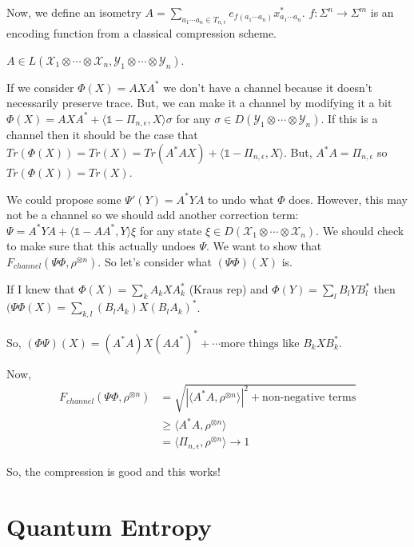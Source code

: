 \documentclass{article}
\begin{document}
\begin{theorem}
        Now, we define an isometry $ A = \sum\limits_{a_1 \cdots a_n \in
        T_{n,\epsilon} } e_{f(a_1\cdots a_n)} x_{a_1 \cdots a_n}^* $.
    $f: \Sigma^n \rightarrow \Sigma^m$ is an encoding function from a
    classical compression scheme.

    $ A \in L(\mathcal{X}_1 \otimes \cdots \otimes \mathcal{X}_n,
        \mathcal{Y}_1
    \otimes \cdots \otimes \mathcal{Y}_n) $.

    If we consider $ \Phi(X) = A X A^* $ we don't have a channel because
    it doesn't necessarily preserve trace. But, we can make it a channel
    by modifying it a bit $ \Phi(X) = A X A^* + \langle
    \mathds{1}-\Pi_{n,\epsilon},X\rangle\sigma $ for any $\sigma \in
    D(\mathcal{Y}_1\otimes\cdots\otimes \mathcal{Y}_n)$. If this is a
    channel then it should be the case that $Tr(\Phi(X)) = Tr(X) =
    Tr(A^*AX) + \langle \mathds{1}-\Pi_{n,\epsilon},X \rangle$. But,
    $A^*A = \Pi_{n,\epsilon}$ so $Tr(\Phi(X)) = Tr(X)$.

    We could propose some $ \Psi'(Y) = A^* Y A  $ to undo what $\Phi$
    does. However, this may not be a channel so we should add another
    correction term: $\Psi = A^* Y A + \langle \mathds{1} - A
    A^*,Y\rangle \xi$ for any state $\xi \in D(\mathcal{X}_1 \otimes
    \cdots \otimes \mathcal{X}_n)$. We should check to make sure that
    this actually undoes $\Psi$. We want to show that
    $F_{channel}(\Psi\Phi,\rho^{\otimes n})$. So let's consider what
    $(\Psi \Phi)(X)$ is.

    If I knew that $\Phi(X) = \sum_k A_k X A_k^*$ (Kraus rep) and $
    \Phi(Y) = \sum_l B_l Y B_l^* $ then 
    $ (\Psi\Phi(X) = \sum_{k,l} (B_l A_k)X(B_lA_k)^* $. 

    So, $ (\Phi\Psi)(X) = (A^*A)X(A A^*)^* + \cdots
    \text{more things like $B_k X B_k^*$} $.

    Now, \begin{align*}
        F_{channel}(\Psi\Phi, \rho^{\otimes n}) &= \sqrt{ | \langle
        A^*A,\rho^{\otimes n} \rangle |^2 + \text{non-negative terms} }
        \\
        &\ge \langle A^*A,\rho^{\otimes n} \rangle \\
        &= \langle \Pi_{n,\epsilon} ,\rho^{\otimes n}\rangle \rightarrow
1
    \end{align*}

    So, the compression is good and this works!

    \section{Quantum Entropy}

\end{theorem}
\end{document}
